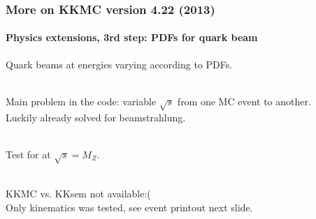 \documentclass{beamer}
\newcommand{\cbl}{\color{blue}}
\begin{document}
\begin{frame}[fragile]
\frametitle{\bf More on KKMC version 4.22 (2013)}
\framesubtitle{\bf\large Physics extensions, 3rd step: PDFs for quark beam}
\large
Quark {\cbl beams} at energies varying according to PDFs.

~~~\\
{\footnotesize
Main problem in the code: variable $\sqrt{s}$ from one MC event to another.\\
Luckily already solved for beamstrahlung.
}

~~~\\
Test for \fbox{\cbl $u \bar{u} \to e^- e^+ +n\gamma$}
at $\sqrt{s}=M_Z$.

~~~\\
KKMC vs. KKsem not available:(\\
Only kinematics was tested, see event printout next slide.

\end{frame}
\end{document}
